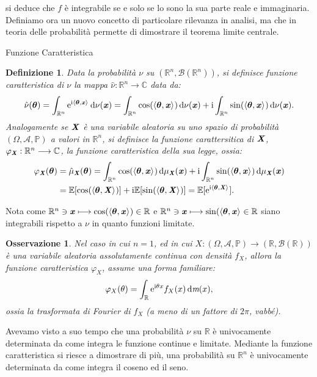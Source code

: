 \documentclass[11pt]{book}
\theoremstyle{Definizione}
\newtheorem*{mydef}{Definizione}
\theoremstyle{TeoremaProposizioneLemmaCorollario}
\theoremstyle{OsservazioneNota}
\newtheorem{myobs}{Osservazione}[section]
\newcommand{\R}{\mathbb{R}}
\newcommand{\C}{\mathbb{C}}
\newcommand{\prsc}[3][]{\left\langle {#2},{#3}\right\rangle_{#1}}
\newcommand{\mybold}[1]{\boldsymbol{#1}}
\newcommand{\gri}[1]{\textbf{\textit{{#1}}}}
\renewcommand{\P}{\mathbb{P}}
\renewcommand{\d}{\mathrm{d}}
\newcommand{\dm}{\,\d \textit{m}}
\newcommand{\e}{\textup{e}}
\renewcommand{\i}{\textup{i}}
\newcommand{\E}{\mathbb{E}}
\begin{document}
si deduce che $f$ è integrabile se e solo se lo sono la sua parte reale e immaginaria.\\
\indent
Definiamo ora un nuovo concetto di particolare rilevanza in analisi, ma che in teoria delle probabilità permette di dimostrare il teorema limite centrale.
\begin{boxdef}{Funzione Caratteristica}
\begin{mydef}
Data la probabilità $\nu$ su $(\R^n,\mathcal{B}(\R^n))$, si definisce funzione caratteristica di $\nu$ la mappa $\hat{\nu}:\R^n \longrightarrow \C$ data da:
$$
\hat{\nu}(\mybold{\theta}) = \int_{\R^n} \e^{\i\prsc{\mybold{\theta}}{\gri{x}}}\, \d \nu(\gri{x}) = \int_{\R^n} \cos(\prsc{\mybold{\theta}}{\gri{x}}) \,\d\nu(\gri{x}) + \i \int_{\R^n} \sin(\prsc{\mybold{\theta}}{\gri{x}})\,\d\nu(\gri{x}).
$$
Analogamente se $\gri{X}$ è una variabile aleatoria su uno spazio di probabilità $(\Omega,\mathcal{A},\P)$ a valori in $\R^n$, si definisce la funzione carattersitica di $\gri{X}$, $\varphi_{\gri{X}}:\R^n \longrightarrow \C$, la funzione caratteristica della sua legge, ossia:
\begin{align*}
\varphi_{\gri{X}}(\mybold{\theta}) &= \hat{\mu}_{\gri{X}}(\mybold{\theta}) = \int_{\R^n} \cos(\prsc{\mybold{\theta}}{\gri{x}}) \,\d\mu_{\gri{X}}(\gri{x}) + \i \int_{\R^n} \sin(\prsc{\mybold{\theta}}{\gri{x}})\,\d\mu_{\gri{X}}(\gri{x}) \\
&= \E[\cos(\prsc{\mybold{\theta}}{\gri{X}})]+\i \E[\sin(\prsc{\mybold{\theta}}{\gri{X}})] = \E[\e^{\i\prsc{\mybold{\theta}}{\gri{X}}}].
\end{align*}
\end{mydef}
\end{boxdef}
\noindent
Nota come $\R^n \ni \gri{x}\longmapsto \cos(\prsc{\mybold{\theta}}{\gri{x}})\in \R$ e $\R^n \ni \gri{x}\longmapsto \sin(\prsc{\mybold{\theta}}{\gri{x}}\in \R$ siano integrabili rispetto a $\nu$ in quanto funzioni limitate.
\begin{myobs}
Nel caso in cui $n = 1$, ed in cui $X:(\Omega,\mathcal{A},\P) \longrightarrow (\R,\mathcal{B}(\R))$ è una variabile aleatoria assolutamente continua con densità $f_X$, allora la funzione caratteristica $\varphi_X$, assume una forma familiare:
$$
\varphi_X(\theta) = \int_\R \e^{\i \theta x} f_X(x)\dm(x),
$$
ossia la trasformata di Fourier di $f_X$ (a meno di un fattore di $2\pi$, vabbé).
\end{myobs}
Avevamo visto a suo tempo che una probabilità $\nu$ su $\R$ è univocamente determinata da come integra le funzione continue e limitate. Mediante la funzione caratteristica si riesce a dimostrare di più, una probabilità su $\R^n$ è univocamente determinata da come integra il coseno ed il seno.
\end{document}
